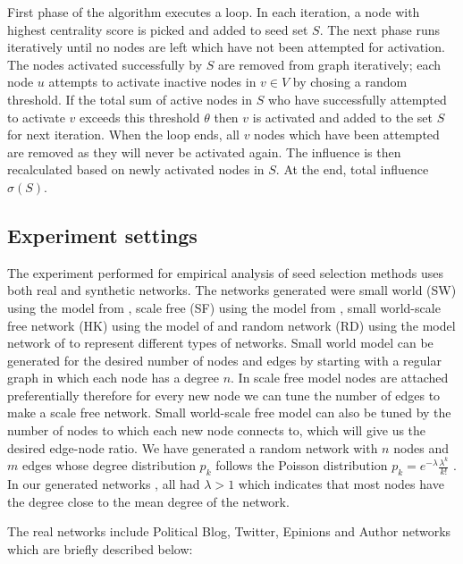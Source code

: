 	First phase of the algorithm executes a loop. In each iteration, a node with highest centrality score is picked and added to seed set $S$. The next phase runs iteratively until no nodes are left which have not been attempted for activation. The nodes activated successfully by $S$ are removed from graph iteratively; each node $u$ attempts to activate inactive nodes in $v\in V$ by chosing a random threshold. If the total sum of active nodes in $S$ who have successfully attempted to activate $v$ exceeds this threshold $\theta$ then $v$ is activated and added to the set $S$ for next iteration. When the loop ends, all $v$ nodes which have been attempted are removed as they will never be activated again. The influence is then recalculated based on newly activated nodes in $S$. At the end, total influence $\sigma(S)$.
	
		\subsection{Experiment settings} 
		The experiment performed for empirical analysis of seed selection methods uses both real and synthetic networks. The networks generated were small world (SW) using the model from \cite{watts1998}, scale free (SF) using the model from \cite{barabasi1999}, small world-scale free network (HK) using the model of \cite{holme2002} and random network (RD) using the model network of \cite{erdos1960} to represent different types of networks. Small world model can be generated for the desired number of nodes and edges by starting with a regular graph in which each node has a degree $n$. In scale free model nodes are attached preferentially therefore for every new node we can tune the number of edges to make a scale free network. Small world-scale free model can also be tuned by the number of nodes to which each new node connects to, which will give us the desired edge-node ratio. We have generated a random network with $n$ nodes and $m$ edges whose degree distribution $p_k$ follows the Poisson distribution $p_k = e^{-\lambda} \frac{\lambda^k}{k!}$ . In our generated networks , all had $\lambda > 1$ which indicates that most nodes have the degree close to the mean degree of the network.
		
		The real networks include Political Blog, Twitter, Epinions and Author networks which are briefly described below:
		
